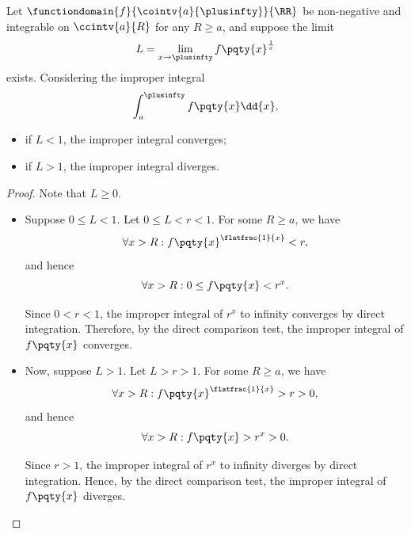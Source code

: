 \begin{proposition}
    \label{prop:int-test-root}%
    Let \(\functiondomain{f}{\cointv{a}{\plusinfty}}{\RR}\) be non-negative and integrable on \(\ccintv{a}{R}\) for any \(R \geq a\), and suppose the limit
    \[
        L = \lim_{x \to \plusinfty} f\pqty{x}^{\frac{1}{x}}
    \]
    exists. Considering the improper integral
    \[
        \int_{a}^{\plusinfty} f\pqty{x} \dd{x},
    \]
    \begin{itemize}
        \item if \(L < 1\), the improper integral converges; 
        \item if \(L > 1\), the improper integral diverges.
    \end{itemize}
\end{proposition}

\begin{proof}
    Note that \(L \geq 0\).

    \begin{itemize}
        \item Suppose \(0 \leq L < 1\). Let \(0 \leq L < r < 1\). For some \(R \geq a\), we have
        \[
            \forall x > R: f\pqty{x}^{\flatfrac{1}{x}} < r,
        \]
        and hence
        \[
            \forall x > R: 0 \leq f\pqty{x} < r^x.
        \]

        Since \(0 < r < 1\), the improper integral of \(r^x\) to infinity converges by direct integration. Therefore, by the direct comparison test, the improper integral of \(f\pqty{x}\) converges.

        \item Now, suppose \(L > 1\). Let \(L > r > 1\). For some \(R \geq a\), we have
        \[
            \forall x > R: f\pqty{x}^{\flatfrac{1}{x}} > r > 0,
        \]
        and hence
        \[
            \forall x > R: f\pqty{x} > r^x > 0.
        \]

        Since \(r > 1\), the improper integral of \(r^x\) to infinity diverges by direct integration. Hence, by the direct comparison test, the improper integral of \(f\pqty{x}\) diverges.
    \end{itemize}
\end{proof}

